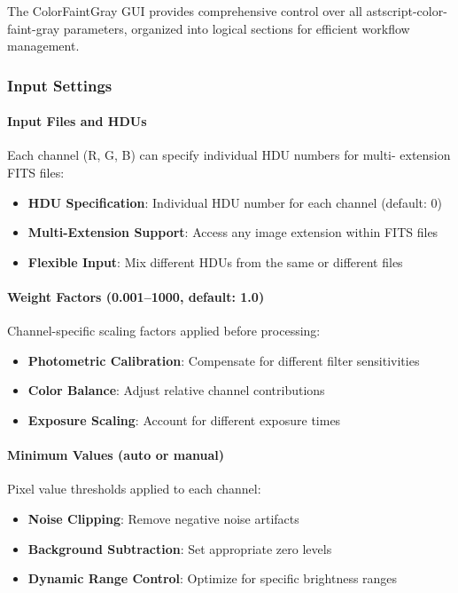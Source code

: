 \documentclass[11pt,a4paper]{article}
\begin{document}
The ColorFaintGray GUI provides comprehensive control over all
astscript-color-faint-gray parameters, organized into logical sections for
efficient workflow management.

\subsubsection{Input Settings}

\paragraph{Input Files and HDUs}
Each channel (R, G, B) can specify individual HDU numbers for multi-
extension FITS files:
\begin{itemize}[leftmargin=*]
\item \textbf{HDU Specification}: Individual HDU number for each channel
(default: 0)
\item \textbf{Multi-Extension Support}: Access any image extension within
FITS files
\item \textbf{Flexible Input}: Mix different HDUs from the same or
different files
\end{itemize}

\paragraph{Weight Factors (0.001--1000, default: 1.0)}
Channel-specific scaling factors applied before processing:
\begin{itemize}[leftmargin=*]
\item \textbf{Photometric Calibration}: Compensate for different filter
sensitivities
\item \textbf{Color Balance}: Adjust relative channel contributions
\item \textbf{Exposure Scaling}: Account for different exposure times
\end{itemize}

\paragraph{Minimum Values (auto or manual)}
Pixel value thresholds applied to each channel:
\begin{itemize}[leftmargin=*]
\item \textbf{Noise Clipping}: Remove negative noise artifacts
\item \textbf{Background Subtraction}: Set appropriate zero levels
\item \textbf{Dynamic Range Control}: Optimize for specific brightness
ranges
\end{itemize}
\end{document}
